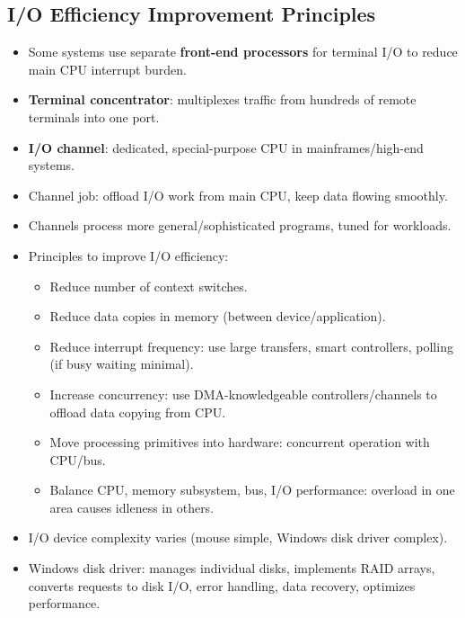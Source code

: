 \subsection{I/O Efficiency Improvement Principles}
\begin{itemize}
    \item Some systems use separate \textbf{front-end processors} for terminal I/O to reduce main CPU interrupt burden.
    \item \textbf{Terminal concentrator}: multiplexes traffic from hundreds of remote terminals into one port.
    \item \textbf{I/O channel}: dedicated, special-purpose CPU in mainframes/high-end systems.
    \item Channel job: offload I/O work from main CPU, keep data flowing smoothly.
    \item Channels process more general/sophisticated programs, tuned for workloads.
    \item Principles to improve I/O efficiency:
    \begin{itemize}
        \item Reduce number of context switches.
        \item Reduce data copies in memory (between device/application).
        \item Reduce interrupt frequency: use large transfers, smart controllers, polling (if busy waiting minimal).
        \item Increase concurrency: use DMA-knowledgeable controllers/channels to offload data copying from CPU.
        \item Move processing primitives into hardware: concurrent operation with CPU/bus.
        \item Balance CPU, memory subsystem, bus, I/O performance: overload in one area causes idleness in others.
    \end{itemize}
    \item I/O device complexity varies (mouse simple, Windows disk driver complex).
    \item Windows disk driver: manages individual disks, implements RAID arrays, converts requests to disk I/O, error handling, data recovery, optimizes performance.
\end{itemize}

